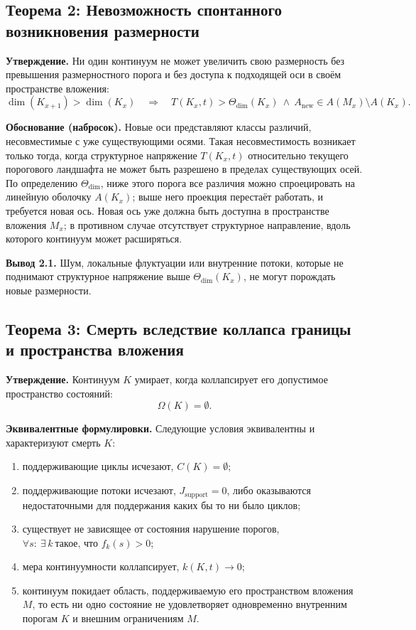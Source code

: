 \subsection{Теорема 2: Невозможность спонтанного возникновения размерности}

\textbf{Утверждение.}
Ни один континуум не может увеличить свою размерность без превышения размерностного порога и без доступа к подходящей оси в своём пространстве вложения:
\[
    \dim(K_{x+1}) > \dim(K_x)
    \quad\Rightarrow\quad
    T(K_x,t) > \Theta_{\mathrm{dim}}(K_x)
    \ \wedge\
    A_{\mathrm{new}} \in A(M_x)\setminus A(K_x).
\]

\textbf{Обоснование (набросок).}
Новые оси представляют классы различий, несовместимые с уже существующими осями.
Такая несовместимость возникает только тогда, когда структурное напряжение \(T(K_x,t)\) относительно текущего порогового ландшафта не может быть разрешено в пределах существующих осей.
По определению \(\Theta_{\mathrm{dim}}\), ниже этого порога все различия можно спроецировать на линейную оболочку \(A(K_x)\); выше него проекция перестаёт работать, и требуется новая ось.
Новая ось уже должна быть доступна в пространстве вложения \(M_x\); в противном случае отсутствует структурное направление, вдоль которого континуум может расширяться.

\textbf{Вывод 2.1.}
Шум, локальные флуктуации или внутренние потоки, которые не поднимают структурное напряжение выше \(\Theta_{\mathrm{dim}}(K_x)\), не могут порождать новые размерности.

\subsection{Теорема 3: Смерть вследствие коллапса границы и пространства вложения}

\textbf{Утверждение.}
Континуум \(K\) умирает, когда коллапсирует его допустимое пространство состояний:
\[
    \Omega(K) = \emptyset.
\]

\textbf{Эквивалентные формулировки.}
Следующие условия эквивалентны и характеризуют смерть \(K\):
\begin{enumerate}
    \item поддерживающие циклы исчезают, \(C(K) = \emptyset\);
    \item поддерживающие потоки исчезают, \(J_{\mathrm{support}} = 0\), либо оказываются недостаточными для поддержания каких бы то ни было циклов;
    \item существует не зависящее от состояния нарушение порогов, \(\forall s:\ \exists\,k\ \text{такое, что } f_k(s) > 0\);
    \item мера континуумности коллапсирует, \(k(K,t) \to 0\);
    \item континуум покидает область, поддерживаемую его пространством вложения \(M\), то есть ни одно состояние не удовлетворяет одновременно внутренним порогам \(K\) и внешним ограничениям \(M\).
\end{enumerate}

